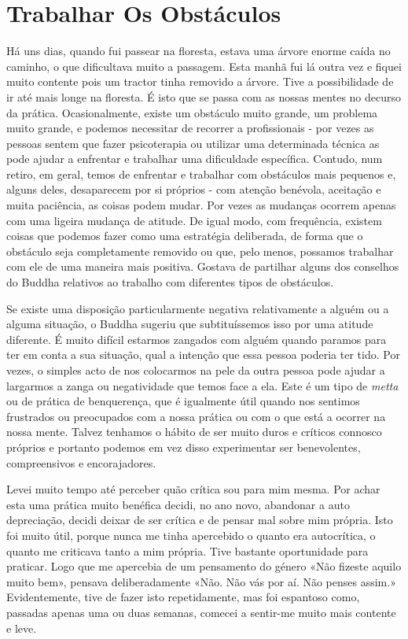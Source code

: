 \chapter{Trabalhar Os Obstáculos}

Há uns dias, quando fui passear na floresta, estava uma árvore enorme
caída no caminho, o que dificultava muito a passagem. Esta manhã fui lá
outra vez e fiquei muito contente pois um tractor tinha removido a
árvore. Tive a possibilidade de ir até mais longe na floresta. É isto
que se passa com as nossas mentes no decurso da prática. Ocasionalmente,
existe um obstáculo muito grande, um problema muito grande, e podemos
necessitar de recorrer a profissionais - por vezes as pessoas sentem que
fazer psicoterapia ou utilizar uma determinada técnica as pode ajudar a
enfrentar e trabalhar uma dificuldade específica. Contudo, num retiro,
em geral, temos de enfrentar e trabalhar com obstáculos mais pequenos e,
alguns deles, desaparecem por si próprios - com atenção benévola,
aceitação e muita paciência, as coisas podem mudar. Por vezes as
mudanças ocorrem apenas com uma ligeira mudança de atitude. De igual
modo, com frequência, existem coisas que podemos fazer como uma
estratégia deliberada, de forma que o obstáculo seja completamente
removido ou que, pelo menos, possamos trabalhar com ele de uma maneira
mais positiva. Gostava de partilhar alguns dos conselhos do Buddha
relativos ao trabalho com diferentes tipos de obstáculos.

Se existe uma disposição particularmente negativa relativamente a alguém
ou a alguma situação, o Buddha sugeriu que subtituíssemos isso por uma
atitude diferente. É muito difícil estarmos zangados com alguém quando
paramos para ter em conta a sua situação, qual a intenção que essa
pessoa poderia ter tido. Por vezes, o simples acto de nos colocarmos na
pele da outra pessoa pode ajudar a largarmos a zanga ou negatividade que
temos face a ela. Este é um tipo de \emph{metta} ou de prática de
benquerença, que é igualmente útil quando nos sentimos frustrados ou
preocupados com a nossa prática ou com o que está a ocorrer na nossa
mente. Talvez tenhamos o hábito de ser muito duros e críticos connosco
próprios e portanto podemos em vez disso experimentar ser benevolentes,
compreensivos e encorajadores.

Levei muito tempo até perceber quão crítica sou para mim mesma. Por
achar esta uma prática muito benéfica decidi, no ano novo, abandonar a
auto depreciação, decidi deixar de ser crítica e de pensar mal sobre mim
própria. Isto foi muito útil, porque nunca me tinha apercebido o quanto
era autocrítica, o quanto me criticava tanto a mim própria. Tive
bastante oportunidade para praticar. Logo que me apercebia de um
pensamento do género «Não fizeste aquilo muito bem», pensava
deliberadamente «Não. Não vás por aí. Não penses assim.» Evidentemente,
tive de fazer isto repetidamente, mas foi espantoso como, passadas
apenas uma ou duas semanas, comecei a sentir-me muito mais contente e
leve.

